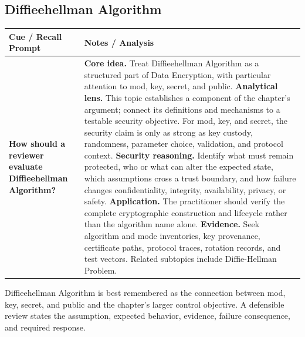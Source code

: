 \documentclass[11pt]{article}
\newcommand{\CornellHeader}{%
\rowcolor{Navy}\color{white}\bfseries Cue / Recall Prompt & \color{white}\bfseries Notes / Analysis\\\hline}
\newcommand{\CornellRow}[2]{%
\cellcolor{CueGray}\RaggedRight\textbf{#1} & \RaggedRight #2\\\hline}
\begin{document}
\subsection*{Diffieehellman Algorithm}
\begin{longtable}{>{\RaggedRight\arraybackslash}p{}|>{\RaggedRight\arraybackslash}p{}}
\CornellHeader
\CornellRow{How should a reviewer evaluate Diffieehellman Algorithm?}{\textbf{Core idea.} Treat Diffieehellman Algorithm as a structured part of Data Encryption, with particular attention to mod, key, secret, and public. \textbf{Analytical lens.} This topic establishes a component of the chapter's argument; connect its definitions and mechanisms to a testable security objective. For mod, key, and secret, the security claim is only as strong as key custody, randomness, parameter choice, validation, and protocol context. \textbf{Security reasoning.} Identify what must remain protected, who or what can alter the expected state, which assumptions cross a trust boundary, and how failure changes confidentiality, integrity, availability, privacy, or safety. \textbf{Application.} The practitioner should verify the complete cryptographic construction and lifecycle rather than the algorithm name alone. \textbf{Evidence.} Seek algorithm and mode inventories, key provenance, certificate paths, protocol traces, rotation records, and test vectors. Related subtopics include Diffie-Hellman Problem.}
\end{longtable}
\begin{topicsummary}
Diffieehellman Algorithm is best remembered as the connection between mod, key, secret, and public and the chapter's larger control objective. A defensible review states the assumption, expected behavior, evidence, failure consequence, and required response.
\end{topicsummary}
\end{document}

